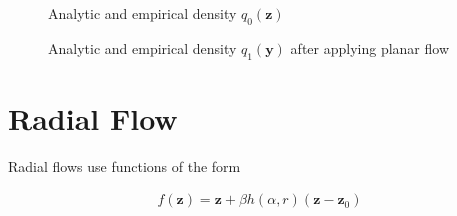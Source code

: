 \documentclass[]{article}
\begin{document}
\begin{figure}
		\centering
	\caption{Analytic and empirical density $q_0(\mathbf{z})$}
	\label{fig:q0}
\end{figure}

\begin{figure}
	\centering
	\caption{Analytic and empirical density $q_1(\mathbf{y})$ after applying planar flow}
	\label{fig:q1-planar}
\end{figure}

\section{Radial Flow}
Radial flows use functions of the form

\begin{align*}
f(\mathbf{z}) = \mathbf{z} + \beta h(\alpha,r)(\mathbf{z}-\mathbf{z}_0)
\label{eq:radialfn}
\end{align*}
\end{document}
